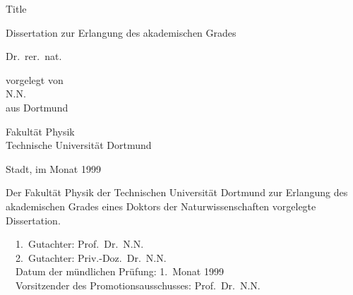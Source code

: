 
\begin{titlepage}

\vspace*{20ex}
{%
\Huge \sffamily \bfseries 
\begin{center}
Title
\end{center} 
}%

\begin{otherlanguage}{german}
{%
\LARGE \sffamily %
\begin{center}
Dissertation zur Erlangung des akademischen Grades\\
\end{center}
}

{%
\LARGE \sffamily %
\begin{center}
Dr.~rer.~nat.
\end{center}
}

\vspace{5ex}


{%
\Large \rmfamily
\begin{center}
vorgelegt von \\[0.8ex]
N.N. \\[0.8ex]
aus Dortmund
\end{center}
}
\vspace{5ex}
{%
\Large \rmfamily
\begin{center}
Fakultät Physik\\
Technische Universität Dortmund
\end{center}
}
\vspace{4ex}
{%
\Large \rmfamily
\begin{center}
Stadt, im Monat 1999
\end{center}
}

\clearpage
\thispagestyle{empty}
\vspace*{\fill}
\noindent Der Fakultät Physik der Technischen Universität Dortmund zur Erlangung
des akademischen Grades eines Doktors der Naturwissenschaften vorgelegte
Dissertation.\\

\parbox{\textwidth}{
  1.~Gutachter: Prof.~Dr.~N.N. \\
  2.~Gutachter: Priv.-Doz.~Dr.~N.N.\\
  Datum der mündlichen Prüfung: 1.~Monat 1999\\
  Vorsitzender des Promotionsausschusses: Prof.~Dr.~N.N.
}
\end{otherlanguage}
\end{titlepage}
\setcounter{page}{1}